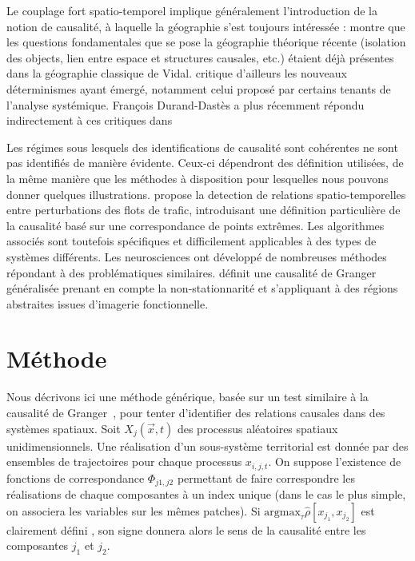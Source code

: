 \documentclass[french]{./sageo}
\begin{document}
Le couplage fort spatio-temporel implique généralement l'introduction de la notion de causalité, à laquelle la géographie s'est toujours intéressée : \cite{loi1985etude} montre que les questions fondamentales que se pose la géographie théorique récente (isolation des objects, lien entre espace et structures causales, etc.) étaient déjà présentes dans la géographie classique de Vidal. \cite{claval1985causalite} critique d'ailleurs les nouveaux déterminismes ayant émergé, notamment celui proposé par certains tenants de l'analyse systémique. François Durand-Dastès a plus récemment répondu indirectement à ces critiques dans \cite{durand2003geographes}


Les régimes sous lesquels des identifications de causalité sont cohérentes ne sont pas identifiés de manière évidente. Ceux-ci dépendront des définition utilisées, de la même manière que les méthodes à disposition pour lesquelles nous pouvons donner quelques illustrations. \cite{liu2011discovering} propose la detection de relations spatio-temporelles entre perturbations des flots de trafic, introduisant une définition particulière de la causalité basé sur une correspondance de points extrêmes. Les algorithmes associés sont toutefois spécifiques et difficilement applicables à des types de systèmes différents. Les neurosciences ont développé de nombreuses méthodes répondant à des problématiques similaires. \cite{luo2013spatio} définit une causalité de Granger généralisée prenant en compte la non-stationnarité et s'appliquant à des régions abstraites issues d'imagerie fonctionnelle.



\section{Méthode}


Nous décrivons ici une méthode générique, basée sur un test similaire à la causalité de Granger~\cite{}, pour tenter d'identifier des relations causales dans des systèmes spatiaux. Soit $X_j(\vec{x},t)$ des processus aléatoires spatiaux unidimensionnels. Une réalisation d'un sous-système territorial est donnée par des ensembles de trajectoires pour chaque processus $x_{i,j,t}$. On suppose l'existence de fonctions de correspondance $\Phi_{j1,j2}$ permettant de faire correspondre les réalisations de chaque composantes à un index unique (dans le cas le plus simple, on associera les variables sur les mêmes patches). Si $\textrm{argmax}_{\tau} \hat{\rho}\left[x_{j_1},x_{j_2}\right]$ est clairement défini %
, son signe donnera alors le sens de la causalité entre les composantes $j_1$ et $j_2$.
\end{document}
